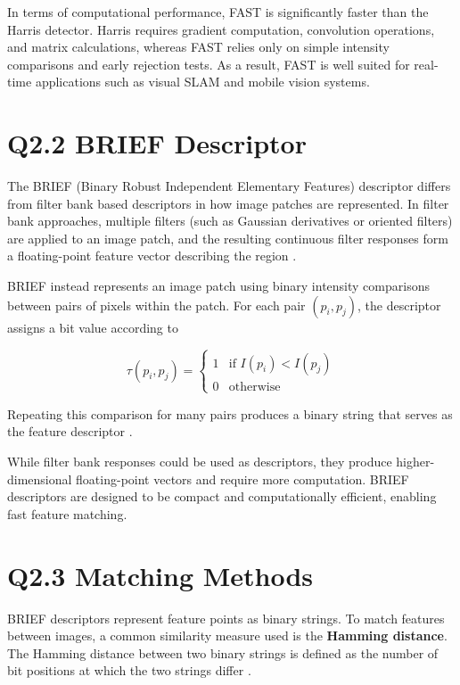 \documentclass[12pt]{article}
\begin{document}
In terms of computational performance, FAST is significantly faster than the Harris detector. Harris requires gradient computation, convolution operations, and matrix calculations, whereas FAST relies only on simple intensity comparisons and early rejection tests. As a result, FAST is well suited for real-time applications such as visual SLAM and mobile vision systems.

\section*{Q2.2 BRIEF Descriptor}

The BRIEF (Binary Robust Independent Elementary Features) descriptor differs from filter bank based descriptors in how image patches are represented. In filter bank approaches, multiple filters (such as Gaussian derivatives or oriented filters) are applied to an image patch, and the resulting continuous filter responses form a floating-point feature vector describing the region \cite{szeliski2022computer}.

BRIEF instead represents an image patch using binary intensity comparisons between pairs of pixels within the patch. For each pair $(p_i, p_j)$, the descriptor assigns a bit value according to

\[
\tau(p_i,p_j) =
\begin{cases}
1 & \text{if } I(p_i) < I(p_j) \\
0 & \text{otherwise}
\end{cases}
\]

Repeating this comparison for many pairs produces a binary string that serves as the feature descriptor \cite{calonder2010brief}.

While filter bank responses could be used as descriptors, they produce higher-dimensional floating-point vectors and require more computation. BRIEF descriptors are designed to be compact and computationally efficient, enabling fast feature matching.

\section*{Q2.3 Matching Methods}

BRIEF descriptors represent feature points as binary strings. To match features between images, a common similarity measure used is the \textbf{Hamming distance}. The Hamming distance between two binary strings is defined as the number of bit positions at which the two strings differ \cite{hamming1950error}.
\end{document}
